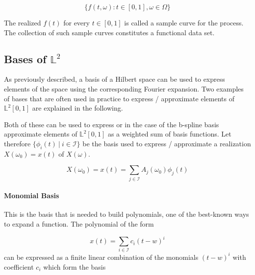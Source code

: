 \documentclass[11pt,twoside,a4paper]{article}
\begin{document}
	
	\begin{equation}
	\{f(t,\omega) : t \in [0, 1], \omega \in \Omega\}
	\end{equation}
	
	The realized $f(t)$ for every $t \in [0,1]$ is called a sample curve for the process. The collection of such sample curves constitutes a functional data set.
	
	\subsection{Bases of $\mathbb{L}^2$} %
	As previously described, a basis of a Hilbert space can be used to express elements of the space using the corresponding Fourier expansion. Two examples of bases that are often used in practice to express / approximate elements of $\mathbb{L}^2[0,1]$  are explained in the following.
	
	Both of these can be used to express or in the case of the b-spline basis approximate elements of $\mathbb{L}^2[0,1]$ as a weighted sum of basis functions. Let therefore $\{\phi_i(t) \: \vert \: i \in \mathcal{I}\}$ be the basis used to express / approximate a realization $X(\omega_0) = x(t)$ of $X(\omega)$.
	
	\begin{equation}
		X(\omega_0) = x(t) = \sum_{j \in \mathcal{I}} A_{j}(\omega_0) \phi_j(t)
	\end{equation}
	
	\paragraph{Monomial Basis}
This is the basis that is needed to build polynomials, one of the best-known ways to expand a function.
The polynomial of the form 

	\begin{equation}
		x(t) = \sum_{i \in \mathcal{I}} c_i(t -w)^{i}
	\end{equation}
	can be expressed as a finite linear combination of the monomials $(t - w)^{i}$ with coefficient $c_i$ which form the basis 
	
\end{document}
